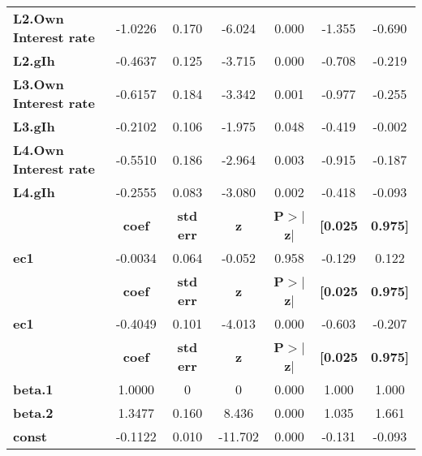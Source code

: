 \documentclass[11pt]{article}
\begin{document}
\begin{center}
\begin{tabular}{lcccccc}
\textbf{L2.Own Interest rate} &      -1.0226  &        0.170     &    -6.024  &         0.000        &       -1.355    &       -0.690     \\
\textbf{L2.gIh}               &      -0.4637  &        0.125     &    -3.715  &         0.000        &       -0.708    &       -0.219     \\
\textbf{L3.Own Interest rate} &      -0.6157  &        0.184     &    -3.342  &         0.001        &       -0.977    &       -0.255     \\
\textbf{L3.gIh}               &      -0.2102  &        0.106     &    -1.975  &         0.048        &       -0.419    &       -0.002     \\
\textbf{L4.Own Interest rate} &      -0.5510  &        0.186     &    -2.964  &         0.003        &       -0.915    &       -0.187     \\
\textbf{L4.gIh}               &      -0.2555  &        0.083     &    -3.080  &         0.002        &       -0.418    &       -0.093     \\
             & \textbf{coef} & \textbf{std err} & \textbf{z} & \textbf{P$> |$z$|$} & \textbf{[0.025} & \textbf{0.975]}  \\
\midrule
\textbf{ec1} &      -0.0034  &        0.064     &    -0.052  &         0.958        &       -0.129    &        0.122     \\
             & \textbf{coef} & \textbf{std err} & \textbf{z} & \textbf{P$> |$z$|$} & \textbf{[0.025} & \textbf{0.975]}  \\
\midrule
\textbf{ec1} &      -0.4049  &        0.101     &    -4.013  &         0.000        &       -0.603    &       -0.207     \\
                & \textbf{coef} & \textbf{std err} & \textbf{z} & \textbf{P$> |$z$|$} & \textbf{[0.025} & \textbf{0.975]}  \\
\midrule
\textbf{beta.1} &       1.0000  &            0     &         0  &         0.000        &        1.000    &        1.000     \\
\textbf{beta.2} &       1.3477  &        0.160     &     8.436  &         0.000        &        1.035    &        1.661     \\
\textbf{const}  &      -0.1122  &        0.010     &   -11.702  &         0.000        &       -0.131    &       -0.093     \\
\bottomrule
\end{tabular}
\end{center}
\end{document}
